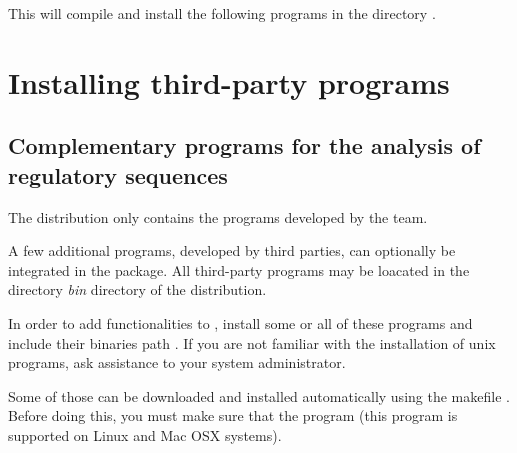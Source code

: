 \documentclass[12pt,a4paper, oneside]{scrreprt} %
\begin{document}
This will compile and install the following programs in the directory
. 














\chapter{Installing third-party programs}

\section{Complementary programs for the analysis of regulatory
  sequences}

The \RSAT distribution only contains the programs developed by the
\RSAT team.

A few additional programs, developed by third parties, can optionally
be integrated in the package. All third-party programs may be loacated
in the directory \emph{bin} directory of the \RSAT distribution.  

In order to add functionalities to \RSAT, install some or all of these
programs and include their binaries path . If you are
not familiar with the installation of unix programs, ask assistance to
your system administrator.

Some of those can be downloaded and installed automatically using the
makefile . Before doing this, you must make
sure that the program  (this program is supported on
Linux  and Mac OSX
systems).
\end{document}
